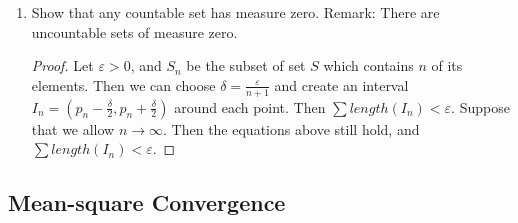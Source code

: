 \documentclass{article}
\begin{document}
\begin{enumerate}
\begin{enumerate}
                  \item Show that any countable set has measure zero. Remark:
                        There are uncountable sets of measure zero.
                        \begin{proof}
                              Let $\varepsilon>0$, and $S_n$ be the subset of set $S$
                              which contains $n$ of its elements. Then we can choose
                              $\delta=\frac{\varepsilon}{n+1}$ and create an interval
                              $I_n=(p_n-\frac{\delta}{2}, p_n+\frac{\delta}{2})$ around
                              each point. Then $\sum length(I_n)<\varepsilon$. Suppose
                              that we allow $n\to\infty$. Then the equations above still
                              hold, and $\sum length(I_n)<\varepsilon$.
                        \end{proof}
            \end{enumerate}
\end{enumerate}

\subsection{Mean-square Convergence}
\end{document}
